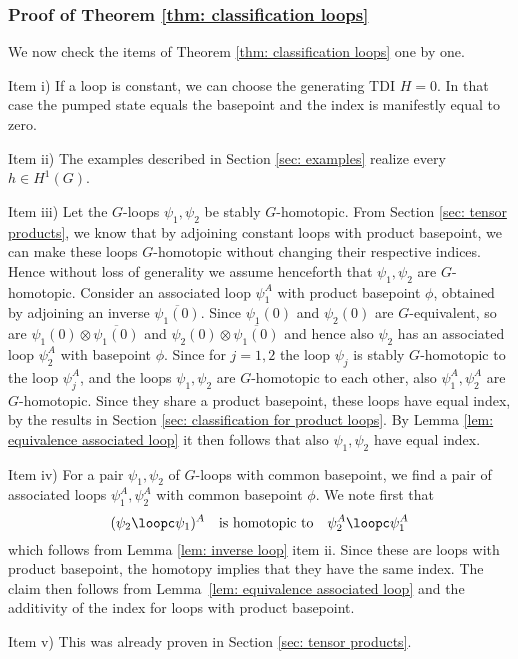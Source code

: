 \subsubsection{Proof of Theorem \ref{thm: classification loops}}

We now check the items of Theorem \ref{thm: classification loops} one by one.

Item i) If a loop is constant, we can choose the generating TDI $H=0$. In that case the pumped state equals the basepoint and the index is manifestly equal to zero.

Item ii)  The examples described in Section \ref{sec: examples} realize every $h\in H^1(G)$.

Item iii) Let the $G$-loops $\psi_1,\psi_2$ be stably $G$-homotopic. From Section \ref{sec: tensor products}, we know that by adjoining constant loops with product basepoint, we can make these loops $G$-homotopic without changing their respective indices. Hence without loss of generality we assume henceforth that $\psi_1,\psi_2$ are $G$-homotopic. 
Consider an associated loop $\psi_1^{A}$ with product basepoint $\phi$, obtained by adjoining an inverse $\overline{\psi_1(0)}$. Since $\psi_1(0)$ and $\psi_2(0)$ are $G$-equivalent, so are $\psi_1(0) \otimes \overline{\psi_1(0)}$ and $\psi_2(0)\otimes \overline{\psi_1(0)}$ and hence also $\psi_2$ has an associated loop $\psi_2^A$ with basepoint $\phi$.
Since for $j=1,2$ the loop $\psi_j$ is stably $G$-homotopic to the loop $\psi_j^A$, and the loops  $\psi_1,\psi_2$ are $G$-homotopic to each other, also $\psi_1^A,\psi_2^A$ are $G$-homotopic.  Since they share a product basepoint, these loops have equal index, by the results in Section \ref{sec: classification for product loops}.  By Lemma \ref{lem: equivalence associated loop}  it then follows that also $\psi_1,\psi_2$ have equal index.

Item iv) For a pair $\psi_1,\psi_2$ of $G$-loops with common basepoint, we find a pair of associated loops $\psi^A_1,\psi^A_2$ with common basepoint $\phi$. 
We note first that
$$
(\psi_2\loopc\psi_1)^A \quad \text{is homotopic to}\quad  \psi^A_2\loopc\psi^A_1
$$
which follows from Lemma \ref{lem: inverse loop} item ii.  Since these are loops with product basepoint, the homotopy implies that they have the same index. The claim then follows from Lemma~\ref{lem: equivalence associated loop} and the additivity of the index for loops with product basepoint.

Item v) This was already proven in Section \ref{sec: tensor products}.

